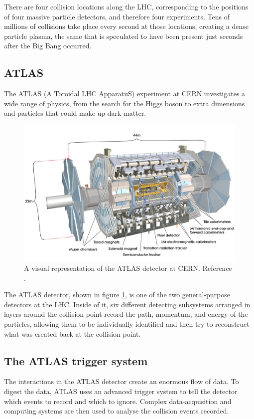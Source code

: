 There are four collision locations along the LHC, corresponding to the positions of four massive particle detectors, and therefore four experiments. Tens of millions of collisions take place every second at those locations, creating a dense particle plasma, the same that is speculated to have been present just seconds after the Big Bang occurred.

\subsection{ATLAS}
The ATLAS (A Toroidal LHC ApparatuS) experiment\cite{aad2008atlas} at CERN  investigates a wide range of physics, from the search for the Higgs boson to extra dimensions and particles that could make up dark matter.

\begin{figure}[t]
    \centering
    \includegraphics[width=1\linewidth]{images/atlas-detector.jpg}
    \caption{A visual representation of the ATLAS detector at CERN. Reference \cite{CERN_official}.}
    \label{fig:atlasdet}
\end{figure}

The ATLAS detector, shown in figure \ref{fig:atlasdet}, is one of the two general-purpose detectors at the LHC. Inside of it, six different detecting subsystems arranged in layers around the collision point record the path, momentum, and energy of the particles, allowing them to be individually identified and then try to reconstruct what was created back at the collision point.

\subsection{The ATLAS trigger system}\label{ch:trigger}
The interactions in the ATLAS detector create an enormous flow of data. To digest the data, ATLAS uses an advanced trigger system to tell the detector which events to record and which to ignore. Complex data-acquisition and computing systems are then used to analyse the collision events recorded.

